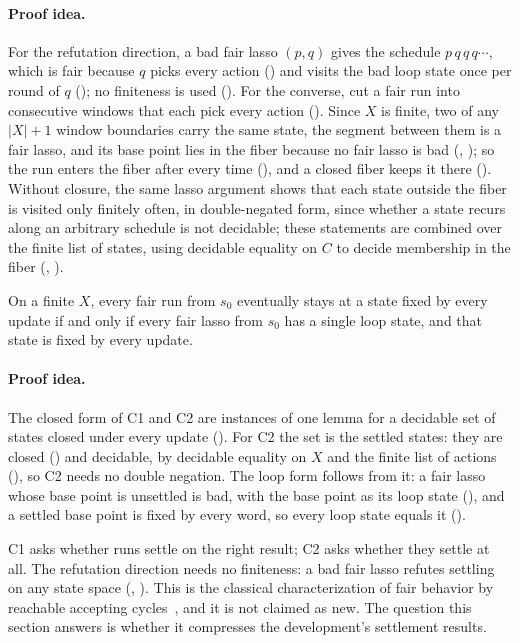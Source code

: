 \paragraph{Proof idea.}
For the refutation direction, a bad fair lasso $(p, q)$ gives the schedule $p\,q\,q\,q\cdots$, which is
fair because $q$ picks every action () and visits the bad loop state once per round
of $q$ (); no finiteness is used (). For the converse, cut a
fair run into consecutive windows that each pick every action (). Since $X$ is
finite, two of any $|X| + 1$ window boundaries carry the same state, the segment between them is a
fair lasso, and its base point lies in the fiber because no fair lasso is bad (,
); so the run enters the fiber after every time (), and a closed fiber
keeps it there (). Without closure, the same lasso argument shows that each state
outside the fiber is visited only finitely often, in double-negated form, since whether a state recurs
along an arbitrary schedule is not decidable; these statements are combined over the finite list of
states, using decidable equality on $C$ to decide membership in the fiber
(, ).

\begin{theorem}\label{thm:c2}
On a finite $X$, every fair run from $s_0$ eventually stays at a state fixed by every update if and
only if every fair lasso from $s_0$ has a single loop state, and that state is fixed by every update.
\end{theorem}

\paragraph{Proof idea.}
The closed form of C1 and C2 are instances of one lemma for a decidable set of states closed under
every update (). For C2 the set is the settled states: they are closed
() and decidable, by decidable equality on $X$ and the finite list of actions
(), so C2 needs no double negation. The loop form follows from it: a fair lasso
whose base point is unsettled is bad, with the base point as its loop state (), and
a settled base point is fixed by every word, so every loop state equals it ().

C1 asks whether runs settle on the right result; C2 asks whether they settle at all. The refutation
direction needs no finiteness: a bad fair lasso refutes settling on any state space
(, ). This is the classical characterization of fair
behavior by reachable accepting cycles~\cite{clarke1986,emersonlei1987,vardi1986}, and it is not
claimed as new. The question this section answers is whether it compresses the development's
settlement results.

